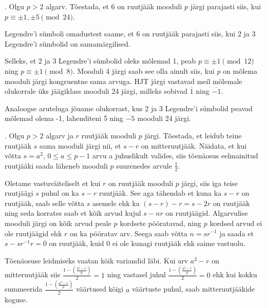 \documentclass[a4paper, 10pt]{article}
\newcommand{\w}{\overline}
\newcommand{\leg}[2]{\left(\frac{#1}{#2}\right)}
\begin{document}
. Olgu $p>2$ algarv. Tõestada, et 6 on ruutjääk mooduli $p$ järgi parajasti siis, kui $p\equiv \pm1,\pm5\pmod{24}$. 

\bigskip
Legendre'i sümboli omadustest saame, et 6 on ruutjääk parajasti siis, kui 2 ja 3 Legendre'i sümbolid on samamärgilised. 

Selleks, et 2 ja 3 Legendre'i sümbolid oleks mõlemad 1, peab $p\equiv\pm1\pmod{12}$ ning $p\equiv\pm1\pmod{8}$. Mooduli 4 järgi saab see olla ainult siis, kui $p$ on mõlema mooduli järgi kongruentne sama arvuga. HJT järgi vastavad meil mõlemale olukorrale üks jäägiklass mooduli 24 järgi, milleks sobivad $\w{1}$ ning $\w{-1}.$ 

Analoogse aruteluga jõuame olukorrast, kus 2 ja 3 Legendre'i sümbolid peavad mõlemad olema -1, lahenditeni $\w{5}$ ning $\w{-5}$ mooduli 24 järgi.


\bigskip

\pagebreak

. Olgu $p>2$ algarv ja $r$ ruutjääk mooduli $p$ järgi. Tõestada, et leidub teine ruutjääk $s$ sama mooduli järgi nii, et $s-r$ on mitteruutjääk. Näidata, et kui võtta $s=a^2$, $0\leq a\leq p-1$ arvu a juhuslikult valides, siis tõenäosus eelmainitud ruutjääki saada läheneb mooduli $p$ suurenedes arvule $\frac12$. 

\bigskip
Oletame vastuväiteliselt et kui $r$ on ruutjääk mooduli $p$ järgi, siis iga teise ruutjäägi $s$ puhul on ka $s-r$ ruutjääk. See aga tähendab et kuna ka $s-r$ on ruutjääk, saab selle võtta $s$ asemele ehk ka $(s-r)-r=s-2r$ on ruutjääk ning seda korrates saab et kõik arvud kujul $s-nr$ on ruutjäägid. Algarvulise mooduli järgi on kõik arvud peale $p$ kordsete pööratavad, ning $p$ kordsed arvud ei ole ruutjäägid ehk $r$ on ka pööratav arv. Seega saab võtta $n=sr^{-1}$ ja saada et $s-sr^{-1}r=0$ on ruutjääk, kuid 0 ei ole kunagi ruutjääk ehk saime vastuolu.

Tõenäosuse leidmiseks vaatan kõik variandid läbi. Kui arv $a^2-r$ on mitteruutjääk siis $\frac{1-\leg {a^2-r}p}2=1$ ning vastasel juhul $\frac{1-\leg {a^2-r}p}2=0$ ehk kui kokku summeerida $\frac{1-\leg {a^2-r}p}2$ väärtused kõigi $a$ väärtuste puhul, saab mitteruutjääkide koguse.
\bigskip
\end{document}
